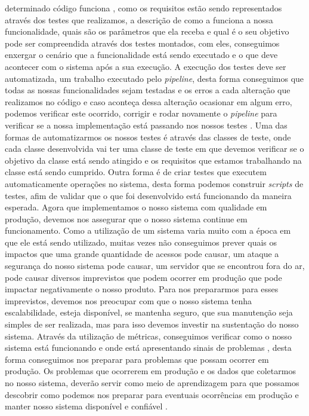       determinado código funciona \cite{martin2007agile}, como os requisitos estão
      sendo representados através dos testes que realizamos, a descrição de como
      a funciona a nossa funcionalidade, quais são os parâmetros que ela receba e
      qual é o seu objetivo pode ser compreendida através dos testes montados, com
      eles, conseguimos enxergar o cenário que a funcionalidade está sendo executado
      e o que deve acontecer com o sistema após a sua execução. \newline
      A execução dos testes deve ser automatizada, um trabalho executado pelo
      \textit{pipeline}, desta forma conseguimos que todas as nossas funcionalidades
      sejam testadas e os erros a cada alteração que realizamos no código e caso
      aconteça dessa alteração ocasionar em algum erro, podemos verificar este
      ocorrido, corrigir e rodar novamente o \textit{pipeline} para verificar se
      a nossa implementação está passando nos nossos testes \cite{ContinuousDelivery}.
      Uma das formas de automatizarmos os nossos testes é através das classes de
      teste, onde cada classe desenvolvida vai ter uma classe de teste em que
      devemos verificar se o objetivo da classe está sendo atingido e os requisitos
      que estamos trabalhando na classe está sendo cumprido. Outra forma é de criar
      testes que executem automaticamente operações no sistema, desta forma podemos
      construir \textit{scripts} de testes, afim de validar que o que foi desenvolvido
      está funcionando da maneira esperada. \newline
      Agora que implementamos o nosso sistema com qualidade em produção, devemos
      nos assegurar que o nosso sistema continue em funcionamento. Como a utilização
      de um sistema varia muito com a época em que ele está sendo utilizado, muitas
      vezes não conseguimos prever quais os impactos que uma grande quantidade de
      acessos pode causar, um ataque a segurança do nosso sistema pode causar,
      um servidor que se encontrou fora do ar, pode causar diversos imprevistos
      que podem ocorrer em produção que pode impactar negativamente o nosso
      produto. \newline
      Para nos prepararmos para esses imprevistos, devemos nos preocupar com que
      o nosso sistema tenha escalabilidade, esteja disponível, se mantenha
      seguro, que sua manutenção seja simples de ser realizada, mas para isso
      devemos investir na sustentação do nosso sistema. Através da utilização
      de métricas, conseguimos verificar como o nosso sistema está funcionando e
      onde está apresentando sinais de problemas \cite{TheDevOpsHandbook}, desta
      forma conseguimos nos preparar para problemas que possam ocorrer em produção.
      Os problemas que ocorrerem em produção e os dados que coletarmos no nosso
      sistema, deverão servir como meio de aprendizagem para que possamos descobrir
      como podemos nos preparar para eventuais ocorrências em produção e manter
      nosso sistema disponível e confiável \cite{SiteReliabilityEngineering}.
